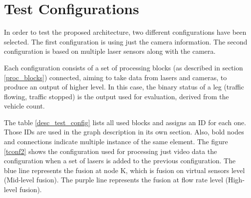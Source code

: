 \section{Test Configurations}

In order to test the proposed architecture, two different configurations have been selected. The first configuration is using just the camera information. The second configuration is based on multiple laser sensors along with the camera.

Each configuration consists of a set of processing blocks (as described in section \ref{proc_blocks}) connected, aiming to take data from  lasers and cameras, to produce an output of higher level. In this case, the binary status of a leg (traffic flowing, traffic stopped) is the output used for evaluation, derived from the vehicle count.

The table \ref{desc_test_config} lists all used blocks and assigns an ID for each one. Those IDs are used in the graph description in its own section. Also, bold nodes and connections indicate multiple instance of the same element. The figure \ref{tconf2} shows the  configuration used for processing just video data the configuration when a set of lasers is added to the previous configuration. The blue line represents the fusion at node K, which is fusion on virtual sensors level (Mid-level fusion). The purple line represents the fusion at flow rate level (High-level fusion).

